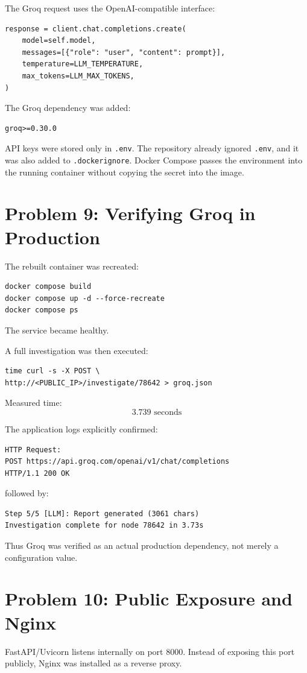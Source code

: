 \documentclass[11pt,a4paper]{article}
\begin{document}
The Groq request uses the OpenAI-compatible interface:
\begin{lstlisting}
response = client.chat.completions.create(
    model=self.model,
    messages=[{"role": "user", "content": prompt}],
    temperature=LLM_TEMPERATURE,
    max_tokens=LLM_MAX_TOKENS,
)
\end{lstlisting}

The Groq dependency was added:
\begin{lstlisting}
groq>=0.30.0
\end{lstlisting}

API keys were stored only in \texttt{.env}. The repository already ignored \texttt{.env}, and it was also added to \texttt{.dockerignore}. Docker Compose passes the environment into the running container without copying the secret into the image.

\section{Problem 9: Verifying Groq in Production}
The rebuilt container was recreated:
\begin{lstlisting}
docker compose build
docker compose up -d --force-recreate
docker compose ps
\end{lstlisting}

The service became healthy.

A full investigation was then executed:
\begin{lstlisting}
time curl -s -X POST \
http://<PUBLIC_IP>/investigate/78642 > groq.json
\end{lstlisting}

Measured time:
\[
\boxed{3.739\text{ seconds}}
\]

The application logs explicitly confirmed:
\begin{lstlisting}
HTTP Request:
POST https://api.groq.com/openai/v1/chat/completions
HTTP/1.1 200 OK
\end{lstlisting}

followed by:
\begin{lstlisting}
Step 5/5 [LLM]: Report generated (3061 chars)
Investigation complete for node 78642 in 3.73s
\end{lstlisting}

Thus Groq was verified as an actual production dependency, not merely a configuration value.

\section{Problem 10: Public Exposure and Nginx}
FastAPI/Uvicorn listens internally on port 8000. Instead of exposing this port publicly, Nginx was installed as a reverse proxy.
\end{document}
